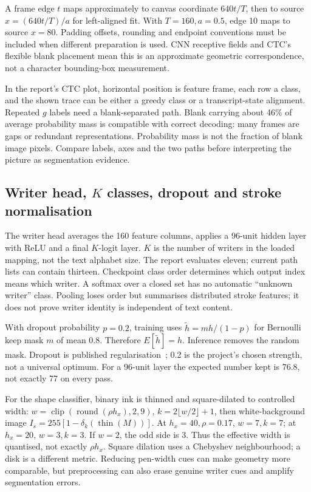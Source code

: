 A frame edge $t$ maps approximately to canvas coordinate $640t/T$, then
to source $x=(640t/T)/a$ for left-aligned fit. With $T=160,a=0.5$, edge
10 maps to source $x=80$. Padding offsets, rounding and endpoint conventions
must be included when different preparation is used. CNN receptive fields
and CTC's flexible blank placement mean this is an approximate geometric
correspondence, not a character bounding-box measurement.

In the report's CTC plot, horizontal position is feature frame, each row a
class, and the shown trace can be either a greedy class or a transcript-state
alignment. Repeated $g$ labels need a blank-separated path. Blank carrying
about 46\% of average probability mass is compatible with correct decoding:
many frames are gaps or redundant representations. Probability mass is not
the fraction of blank image pixels. Compare labels, axes and the two paths
before interpreting the picture as segmentation evidence.

\subsection{Writer head, $K$ classes, dropout and stroke normalisation}
The writer head averages the 160 feature columns, applies a 96-unit hidden
layer with ReLU and a final $K$-logit layer. $K$ is the number of writers in
the loaded mapping, not the text alphabet size. The report evaluates eleven;
current path lists can contain thirteen. Checkpoint class order determines
which output index means which writer. A softmax over a closed set has no
automatic ``unknown writer'' class. Pooling loses order but summarises
distributed stroke features; it does not prove writer identity is independent
of text content.

With dropout probability $p=0.2$, training uses
$\tilde h=m h/(1-p)$ for Bernoulli keep mask $m$ of mean 0.8.
Therefore $E[\tilde h]=h$. Inference removes the random mask. Dropout is
published regularisation~\cite{srivastava2014}; 0.2 is the project's chosen
strength, not a universal optimum. For a 96-unit layer the expected number
kept is 76.8, not exactly 77 on every pass.

For the shape classifier, binary ink is thinned and square-dilated to controlled
width: $w=\operatorname{clip}(\operatorname{round}(\rho h_x),2,9)$,
$k=2\lfloor w/2\rfloor+1$, then white-background image
$I_s=255[1-\delta_k(\operatorname{thin}(M))]$. At $h_x=40,\rho=0.17$,
$w=7,k=7$; at $h_x=20$, $w=3,k=3$. If $w=2$, the odd side is 3.
Thus the effective width is quantised, not exactly $\rho h_x$. Square
dilation uses a Chebyshev neighbourhood; a disk is a different metric.
Reducing pen-width cues can make geometry more comparable, but preprocessing
can also erase genuine writer cues and amplify segmentation errors.

